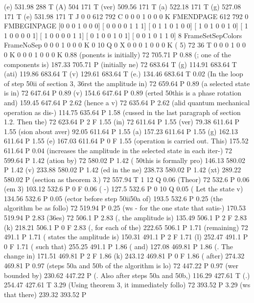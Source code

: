 (e) 531.98 288 T
(A) 504 171 T
(ver) 509.56 171 T
(a) 522.18 171 T
(g) 527.08 171 T
(e) 531.98 171 T
J
0 0 612 792 C
0 0 0 1 0 0 0 K
FMENDPAGE
612 792 0 FMBEGINPAGE
[0 0 0 1 0 0 0]
[ 0 0 0 0 1 1 1]
[ 0 1 1 0 1 0 0]
[ 1 0 1 0 0 1 0]
[ 1 1 0 0 0 0 1]
[ 1 0 0 0 0 1 1]
[ 0 1 0 0 1 0 1]
[ 0 0 1 0 1 1 0]
 8 FrameSetSepColors
FrameNoSep
0 0 0 1 0 0 0 K
0 10 Q
0 X
0 0 0 1 0 0 0 K
(                                                                                        5) 72 36 T
0 0 0 1 0 0 0 K
0 0 0 1 0 0 0 K
0.88 (ponents is initially) 72 705.71 P
0.88 (; one of the components is) 187.33 705.71 P
(initially ne) 72 683.64 T
(g) 114.91 683.64 T
(ati) 119.86 683.64 T
(v) 129.61 683.64 T
(e.) 134.46 683.64 T
0.02 (In the loop of step \050ii of section 3, \336rst the amplitude in) 72 659.64 P
0.89 (a selected state is in) 72 647.64 P
0.89 (v) 154.6 647.64 P
0.89 (erted \050this is a phase rotation and) 159.45 647.64 P
2.62 (hence a v) 72 635.64 P
2.62 (alid quantum mechanical operation as dis-) 114.75 635.64 P
1.58 (cussed in the last paragraph of section 1.2. Then the) 72 623.64 P
2 F
1.55 (in) 72 611.64 P
1.55 (ver) 79.38 611.64 P
1.55 (sion about aver) 92.05 611.64 P
1.55 (a) 157.23 611.64 P
1.55 (g) 162.13 611.64 P
1.55 (e) 167.03 611.64 P
0 F
1.55 (operation is carried out. This) 175.52 611.64 P
0.04 (increases the amplitude in the selected state in each iter-) 72 599.64 P
1.42 (ation by) 72 580.02 P
1.42 ( \050this is formally pro) 146.13 580.02 P
1.42 (v) 233.88 580.02 P
1.42 (ed in the ne) 238.73 580.02 P
1.42 (xt) 289.22 580.02 P
(section as theorem 3.) 72 557.94 T
1 12 Q
0.06 (Theor) 72 532.6 P
0.06 (em 3) 103.12 532.6 P
0 F
0.06 ( -) 127.5 532.6 P
0 10 Q
0.05 ( Let the state v) 134.56 532.6 P
0.05 (ector before step \050ii\050a of) 193.5 532.6 P
0.25 (the algorithm be as follo) 72 519.94 P
0.25 (ws - for the one state that satis-) 170.53 519.94 P
2.83 (\336es) 72 506.1 P
2.83 (, the amplitude is) 135.49 506.1 P
2 F
2.83 (k) 218.21 506.1 P
0 F
2.83 (, for each of the) 222.65 506.1 P
1.71 (remaining) 72 491.1 P
1.71 ( states the amplitude is) 150.31 491.1 P
2 F
1.71 (l) 252.47 491.1 P
0 F
1.71 ( such that) 255.25 491.1 P
1.86 ( and) 127.08 469.81 P
1.86 (. The change in) 171.51 469.81 P
2 F
1.86 (k) 243.12 469.81 P
0 F
1.86 ( after) 274.32 469.81 P
0.97 (steps \050a and \050b of the algorithm is lo) 72 447.22 P
0.97 (wer bounded by) 230.62 447.22 P
(. Also after steps \050a and \050b,) 116.29 427.61 T
(.) 254.47 427.61 T
3.29 (Using theorem 3, it immediately follo) 72 393.52 P
3.29 (ws that there) 239.32 393.52 P
